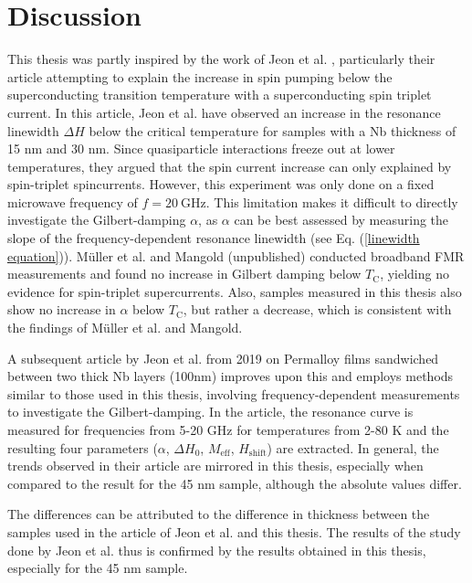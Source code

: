 \section{Discussion}
This thesis was partly inspired by the work of Jeon et al. \cite{Jeon2018}, particularly their article attempting to explain the increase in spin pumping below the superconducting transition temperature with a superconducting spin triplet current. In this article, Jeon et al. have observed an increase in the resonance linewidth $\Delta H$ below the critical temperature for samples with a Nb thickness of 15 nm and 30 nm. Since quasiparticle interactions freeze out at lower temperatures, they argued that the spin current increase can only explained by spin-triplet spincurrents. However, this experiment was only done on a fixed microwave frequency of $f = 20 \ \textrm{GHz}$. This limitation makes it difficult to directly investigate the Gilbert-damping $\alpha$, as $\alpha$ can be best assessed by measuring the slope of the frequency-dependent resonance linewidth (see Eq. (\ref{linewidth equation})). Müller et al. \cite{PhysRevLett.126.087201} and Mangold (unpublished) conducted broadband FMR measurements and found no increase in Gilbert damping below $T_\textrm{C}$, yielding no evidence for spin-triplet supercurrents. Also, samples measured in this thesis also show no increase in $\alpha$ below $T_\textrm{C}$, but rather a decrease, which is consistent with the findings of Müller et al. and Mangold.

A subsequent article by Jeon et al. \cite{Jeon2019} from 2019 on Permalloy films sandwiched between two thick Nb layers (100nm) improves upon this and employs methods similar to those used in this thesis, involving frequency-dependent measurements to investigate the Gilbert-damping. In the article, the resonance curve is measured for frequencies from 5-20 GHz for temperatures from 2-80 K and the resulting four parameters ($\alpha$, $\Delta H_0$, $M_\textrm{eff}$, $H_\textrm{shift}$) are extracted. In general, the trends observed in their article are mirrored in this thesis, especially when compared to the result for the 45 nm sample, although the absolute values differ.

The differences can be attributed to the difference in thickness between the samples used in the article of Jeon et al. and this thesis. The results of the study done by Jeon et al. \cite{Jeon2019} thus is confirmed by the results obtained in this thesis, especially for the 45 nm sample.

